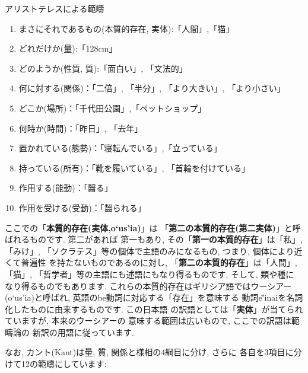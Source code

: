 \begin{itembox}[c]{{アリストテレスによる範疇}}
{\footnotesize
\begin{enumerate}
\item{まさにそれであるもの(本質的存在, 実体):「人間」,「猫」}
\item{どれだけか(量):「128cm」}
\item{どのようか(性質, 質):「面白い」, 「文法的」}
\item{何に対する(関係)：「二倍」, 「半分」, 「より大きい」, 「より小さい」}
\item{どこか(場所)：「千代田公園」,「ペットショップ」}
\item{何時か(時間)：「昨日」, 「去年」}
\item{置かれている(態勢)：「寝転んでいる」,「立っている」}
\item{持っている(所有)：「靴を履いている」, 「首輪を付けている」}
\item{作用する(能動)：「齧る」}
\item{作用を受ける(受動)：「齧られる」}
\end{enumerate}
}
\end{itembox}


ここでの「\textbf{本質的存在(実体,\textgreek{o`us'ia})}」は
「\textbf{第二の本質的存在(第二実体)}」と呼ばれるものです. 第二があれば
第一もあり, その「\textbf{第一の本質的存在}」は「私」, 「みけ」,
「ソクラテス」等の個体で主語のみになるもの, つまり, 個体により近くて普遍性
を持たないものであるのに対し, 「\textbf{第二の本質的存在}」は「人間」,
 「猫」, 「哲学者」等の主語にも述語にもなり得るものです. そして, 類や種に
なり得るものでもあります. これらの本質的存在はギリシア語ではウーシアー
(\textgreek{o`us'ia})と呼ばれ, 英語のbe動詞に対応する「存在」を意味する
動詞\textgreek{e\~{'i}nai}を名詞化したものに由来するものです. この日本語
の訳語としては「\textbf{実体}」が当てられていますが, 本来のウーシアーの
意味する範囲は広いもので, ここでの訳語は範疇論\cite{アリストテレス1}の
新訳の用語に従っています.
\newline


なお, カント(Kant)は量, 質, 関係と様相の4綱目に分け, さらに
各自を3項目に分けて12の範疇にしています:


